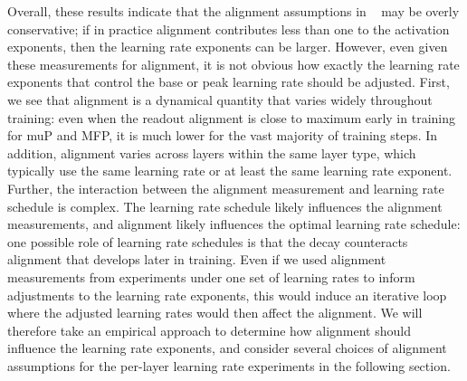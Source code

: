 \documentclass{article}
\theoremstyle{plain}
\theoremstyle{definition}
\theoremstyle{remark}
\begin{document}
Overall, these results indicate that the alignment assumptions in ~\citet{yang2021tensoriv,yang2023tensorivb} may be overly conservative; if in practice alignment contributes less than one to the activation exponents, then the learning rate exponents can be larger. However, even given these measurements for alignment, it is not obvious how exactly the learning rate exponents that control the base or peak learning rate should be adjusted. First, we see that alignment is a dynamical quantity that varies widely throughout training: even when the readout alignment is close to maximum early in training for muP and MFP, it is much lower for the vast majority of training steps. In addition, alignment varies across layers within the same layer type, which typically use the same learning rate or at least the same learning rate exponent. Further, the interaction between the alignment measurement and learning rate schedule is complex. The learning rate schedule likely influences the alignment measurements, and alignment likely influences the optimal learning rate schedule: one possible role of learning rate schedules is that the decay counteracts alignment that develops later in training. Even if we used alignment measurements from experiments under one set of learning rates to inform adjustments to the learning rate exponents, this would induce an iterative loop where the adjusted learning rates would then affect the alignment. We will therefore take an empirical approach to determine how alignment should influence the learning rate exponents, and consider several choices of alignment assumptions for the per-layer learning rate experiments in the following section.
\end{document}
